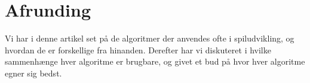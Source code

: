 \section{Afrunding}
Vi har i denne artikel set på de algoritmer der anvendes ofte i spiludvikling, og hvordan de er forskellige fra hinanden.
Derefter har vi diskuteret i hvilke sammenhænge hver algoritme er brugbare, og givet et bud på hvor hver algoritme egner sig bedst.